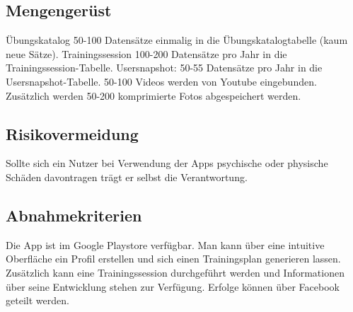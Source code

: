 \documentclass[FIPLY_base.tex]{subfiles}
\begin{document}
	\subsection{Mengengerüst}
	Übungskatalog 50-100 Datensätze einmalig in die Übungskatalogtabelle (kaum neue Sätze).
	Trainingssession 100-200 Datensätze pro Jahr in die Trainingssession-Tabelle.
	Usersnapshot: 50-55 Datensätze pro Jahr in die Usersnapshot-Tabelle.
	50-100 Videos werden von Youtube eingebunden.
	Zusätzlich werden 50-200 komprimierte Fotos abgespeichert werden.
	
	\subsection{Risikovermeidung}
	Sollte sich ein Nutzer bei Verwendung der Apps psychische oder physische Schäden davontragen trägt er selbst die Verantwortung.
	
	\subsection{Abnahmekriterien}
	Die App ist im Google Playstore verfügbar.
	Man kann über eine intuitive Oberfläche ein Profil erstellen und sich einen Trainingsplan generieren lassen. Zusätzlich kann eine Trainingssession durchgeführt werden und Informationen über seine Entwicklung stehen zur Verfügung.
	Erfolge können über Facebook geteilt werden.
	
\end{document}
